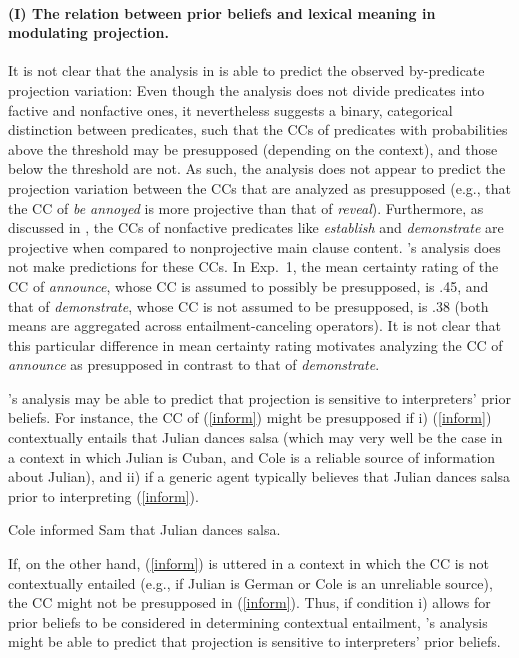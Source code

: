 \documentclass[11pt,fleqn]{article}
\newcommand{\6}{\mbox{$[\hspace*{-.6mm}[$}}
\newcommand{\9}{\mbox{$]\hspace*{-.6mm}]$}}
\newcommand{\citepos}[1]{\citeauthor{#1}'s \citeyear{#1}}
\begin{document}
\paragraph{(I) The relation between prior beliefs and lexical meaning in modulating projection.} It is not clear that the analysis in \citealt{schlenker2021} is able to predict the observed by-predicate projection variation: Even though the analysis does not divide predicates into factive and nonfactive ones, it nevertheless suggests a binary, categorical distinction between predicates, such that the CCs of predicates with probabilities above the threshold may be presupposed (depending on the context), and those below the threshold are not. As such, the analysis does not appear to predict the projection variation between the CCs that are analyzed as presupposed (e.g., that the CC of {\em be annoyed} is more projective than that of {\em reveal}). Furthermore, as discussed in \citealt{degen-tonhauser-language}, the CCs of nonfactive predicates like \emph{establish} and \emph{demonstrate} are projective when compared to nonprojective main clause content. \citepos{schlenker2021} analysis does not make predictions for these CCs. In Exp.~1, the mean certainty rating of the CC of \emph{announce}, whose CC is assumed to possibly be presupposed, is .45, and that of {\em demonstrate}, whose CC is not assumed to be presupposed, is .38 (both means are aggregated across entailment-canceling operators). It is not clear that this particular difference in mean certainty rating motivates analyzing the CC of \emph{announce} as presupposed in contrast to that of \emph{demonstrate}.

\citepos{schlenker2021} analysis may be able to predict that projection is sensitive to interpreters' prior beliefs. For instance, the CC of (\ref{inform}) might be presupposed if  i) (\ref{inform}) contextually entails that Julian dances salsa (which may very well be the case in a context in which Julian is Cuban, and Cole is a reliable source of information about Julian), and ii) if a generic agent typically believes that Julian dances salsa prior to interpreting (\ref{inform}). 

\begin{exe}
\ex\label{inform} Cole informed Sam that Julian dances salsa.
\end{exe}
If, on the other hand, (\ref{inform}) is uttered in a context in which the CC is not contextually entailed (e.g., if Julian is German or Cole is an unreliable source), the CC might not be presupposed in (\ref{inform}). Thus, if condition i) allows for prior beliefs to be considered in determining contextual entailment, \citepos{schlenker2021} analysis might be able to predict that projection is sensitive to interpreters' prior beliefs. 
\end{document}
